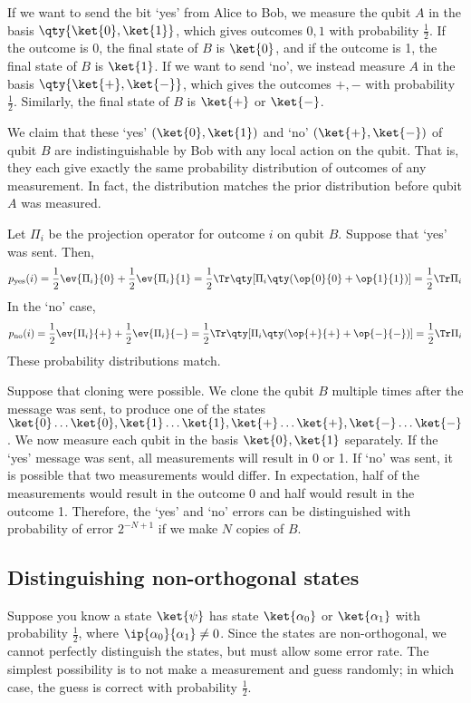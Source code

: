 If we want to send the bit `yes' from Alice to Bob, we measure the qubit $A$ in the basis $\qty{\ket{0}, \ket{1}}$, which gives outcomes $0, 1$ with probability $\frac{1}{2}$.
If the outcome is 0, the final state of $B$ is $\ket{0}$, and if the outcome is 1, the final state of $B$ is $\ket{1}$.
If we want to send `no', we instead measure $A$ in the basis $\qty{\ket{+}, \ket{-}}$, which gives the outcomes $+, -$ with probability $\frac{1}{2}$.
Similarly, the final state of $B$ is $\ket{+}$ or $\ket{-}$.

We claim that these `yes' $(\ket{0}, \ket{1})$ and `no' $(\ket{+}, \ket{-})$  of qubit $B$ are indistinguishable by Bob with any local action on the qubit.
That is, they each give exactly the same probability distribution of outcomes of any measurement.
In fact, the distribution matches the prior distribution before qubit $A$ was measured.

Let $\Pi_i$ be the projection operator for outcome $i$ on qubit $B$.
Suppose that `yes' was sent.
Then,
\[ p_{\text{yes}}(i) = \frac{1}{2}\ev{\Pi_i}{0} + \frac{1}{2}\ev{\Pi_i}{1} = \frac{1}{2} \Tr \qty[\Pi_i \qty(\op{0}{0} + \op{1}{1})] = \frac{1}{2} \Tr \Pi_i \]
In the `no' case,
\[ p_{\text{no}}(i) = \frac{1}{2}\ev{\Pi_i}{+} + \frac{1}{2}\ev{\Pi_i}{-} = \frac{1}{2} \Tr \qty[\Pi_i \qty(\op{+}{+} + \op{-}{-})] = \frac{1}{2} \Tr \Pi_i \]
These probability distributions match.

Suppose that cloning were possible.
We clone the qubit $B$ multiple times after the message was sent, to produce one of the states $\ket{0} \dots \ket{0}, \ket{1} \dots \ket{1}, \ket{+} \dots \ket{+}, \ket{-} \dots \ket{-}$.
We now measure each qubit in the basis $\ket{0}, \ket{1}$ separately.
If the `yes' message was sent, all measurements will result in 0 or 1.
If `no' was sent, it is possible that two measurements would differ.
In expectation, half of the measurements would result in the outcome 0 and half would result in the outcome 1.
Therefore, the `yes' and `no' errors can be distinguished with probability of error $2^{-N+1}$ if we make $N$ copies of $B$.

\subsection{Distinguishing non-orthogonal states}
Suppose you know a state $\ket{\psi}$ has state $\ket{\alpha_0}$ or $\ket{\alpha_1}$ with probability $\frac{1}{2}$, where $\ip{\alpha_0}{\alpha_1} \neq 0$.
Since the states are non-orthogonal, we cannot perfectly distinguish the states, but must allow some error rate.
The simplest possibility is to not make a measurement and guess randomly; in which case, the guess is correct with probability $\frac{1}{2}$.

